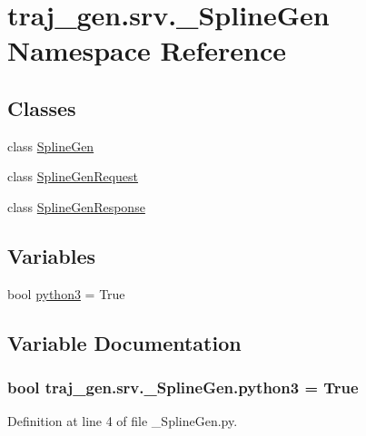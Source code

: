 \hypertarget{namespacetraj__gen_1_1srv_1_1___spline_gen}{}\section{traj\+\_\+gen.\+srv.\+\_\+\+Spline\+Gen Namespace Reference}
\label{namespacetraj__gen_1_1srv_1_1___spline_gen}
\subsection*{Classes}
\begin{DoxyCompactItemize}
\item 
class \hyperlink{classtraj__gen_1_1srv_1_1___spline_gen_1_1_spline_gen}{Spline\+Gen}
\item 
class \hyperlink{classtraj__gen_1_1srv_1_1___spline_gen_1_1_spline_gen_request}{Spline\+Gen\+Request}
\item 
class \hyperlink{classtraj__gen_1_1srv_1_1___spline_gen_1_1_spline_gen_response}{Spline\+Gen\+Response}
\end{DoxyCompactItemize}
\subsection*{Variables}
\begin{DoxyCompactItemize}
\item 
bool \hyperlink{namespacetraj__gen_1_1srv_1_1___spline_gen_a7c82f277a33ffef118e286aaa1e9c8f5}{python3} = True
\end{DoxyCompactItemize}


\subsection{Variable Documentation}
\subsubsection[{\texorpdfstring{python3}{python3}}]{\setlength{\rightskip}{0pt plus 5cm}bool traj\+\_\+gen.\+srv.\+\_\+\+Spline\+Gen.\+python3 = True}\hypertarget{namespacetraj__gen_1_1srv_1_1___spline_gen_a7c82f277a33ffef118e286aaa1e9c8f5}{}\label{namespacetraj__gen_1_1srv_1_1___spline_gen_a7c82f277a33ffef118e286aaa1e9c8f5}


Definition at line 4 of file \+\_\+\+Spline\+Gen.\+py.

